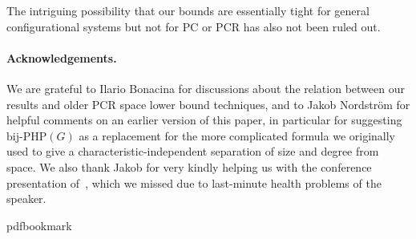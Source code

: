 \documentclass[11pt]{article}
\numberwithin{equation}{section}
\theoremstyle{definition}
\theoremstyle{plain}
\begin{document}
The intriguing possibility that our bounds are essentially tight for
general configurational systems but not for PC or PCR
has also not been ruled out.



\paragraph{Acknowledgements.} 
We are grateful to Ilario Bonacina for discussions about the relation between 
our results and older PCR space lower bound techniques, and to Jakob Nordstr\"{o}m for
helpful comments on an earlier version of this paper, in particular for suggesting
$\mathrm{bij}$-$\mathrm{PHP}(G)$ as a replacement for the more complicated formula 
we originally used to give a characteristic-independent
separation of size and degree from space.  We also thank Jakob for 
very kindly helping us
with the conference presentation of~\cite{conf-version},
which we missed due to last-minute health problems of the speaker.







\newcommand{\prelim}{Preliminary version in\ }\newcommand{\prelims}{Preliminary
  versions in\ }
\providecommand{\bibhead}[1]{}
\expandafter\ifx\csname pdfbookmark\endcsname\relax%
  \providecommand{\tocrefpdfbookmark}{}
\else\providecommand{\tocrefpdfbookmark}{%
   \hypertarget{tocreferences}{}%
   \pdfbookmark[1]{References}{tocreferences}}%
\fi
\end{document}
